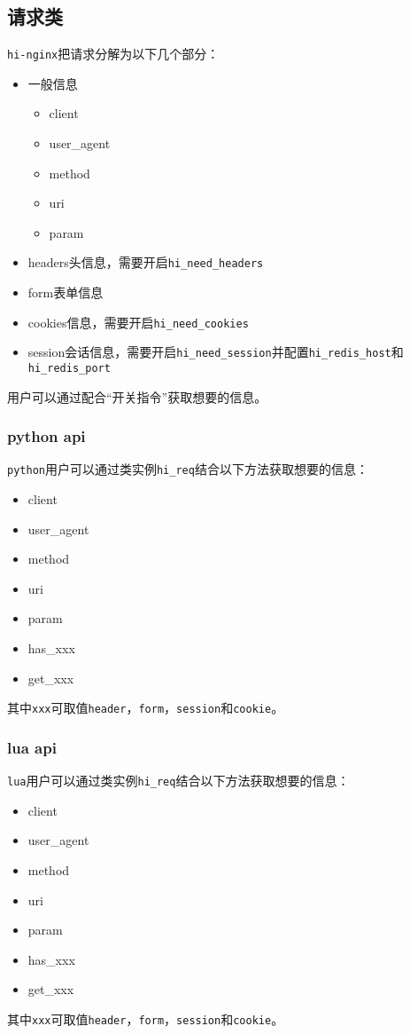 \subsection{请求类}
\texttt{hi-nginx}把请求分解为以下几个部分：
\begin{itemize}
\item 一般信息
	\begin{itemize}
		\item client
		\item user_agent
		\item method
		\item uri
		\item param
	\end{itemize}
\item headers头信息，需要开启\texttt{hi_need_headers}
\item form表单信息
\item cookies信息，需要开启\texttt{hi_need_cookies}
\item session会话信息，需要开启\texttt{hi_need_session}并配置\texttt{hi_redis_host}和\texttt{hi_redis_port}
\end{itemize}
用户可以通过配合“开关指令”获取想要的信息。
\subsubsection{python api}
\texttt{python}用户可以通过类实例\texttt{hi_req}结合以下方法获取想要的信息：
\begin{itemize}
\item client
\item user_agent
\item method
\item uri
\item param
\item has_xxx 
\item get_xxx
\end{itemize}
其中\texttt{xxx}可取值\texttt{header}，\texttt{form}，\texttt{session}和\texttt{cookie}。
\subsubsection{lua api}
\texttt{lua}用户可以通过类实例\texttt{hi_req}结合以下方法获取想要的信息：
\begin{itemize}
\item client
\item user_agent
\item method
\item uri
\item param
\item has_xxx 
\item get_xxx
\end{itemize}
其中\texttt{xxx}可取值\texttt{header}，\texttt{form}，\texttt{session}和\texttt{cookie}。
